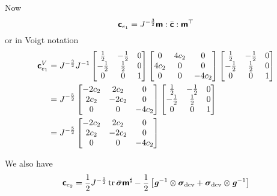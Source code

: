 Now
\begin{equation}
  \boldsymbol{\mathsf{c}}_{e_{1}}=J^{-\frac{3}{2}} \boldsymbol{\mathsf{m}} : \bar{\boldsymbol{\mathsf{c}}} :  {\boldsymbol{\mathsf{m}}}^{ \top }  
\end{equation}
or in Voigt notation
\begin{equation}
  \begin{split}
    \boldsymbol{\mathsf{c}}_{e_{1}}^{V}&=J^{-\frac{3}{2}} {J}^{-1} \begin{bmatrix}
      \frac{1}{2} & -\frac{1}{2} & 0 \\
      -\frac{1}{2} & \frac{1}{2} & 0 \\
      0 & 0 & 1
    \end{bmatrix}\begin{bmatrix}
      0 & 4c_{2} & 0 \\
      4c_{2} & 0 & 0 \\
      0 & 0 & -4c_{2}
    \end{bmatrix}\begin{bmatrix}
      \frac{1}{2} & -\frac{1}{2} & 0 \\
      -\frac{1}{2} & \frac{1}{2} & 0 \\
      0 & 0 & 1
    \end{bmatrix}\\
    &=J^{-\frac{5}{2}}\begin{bmatrix}
      -2c_{2} & 2c_{2} & 0 \\
      2c_{2} & -2c_{2} & 0 \\
      0 & 0 & -4c_{2}
    \end{bmatrix}\begin{bmatrix}
      \frac{1}{2} & -\frac{1}{2} & 0 \\
      -\frac{1}{2} & \frac{1}{2} & 0 \\
      0 & 0 & 1
    \end{bmatrix}\\
    &=J^{-\frac{5}{2}}\begin{bmatrix}
      -2c_{2} & 2c_{2} & 0 \\
      2c_{2} & -2c_{2} & 0 \\
      0 & 0 & -4c_{2}
    \end{bmatrix}
  \end{split}
\end{equation}

We also have
\begin{equation}
  \boldsymbol{\mathsf{c}}_{e_{2}}=\dfrac{1}{2}J^{-\frac{1}{2}}\operatorname{tr}\bar{\boldsymbol{\mathit{\sigma}}}\boldsymbol{\mathsf{m}}^{\sharp}
  -\dfrac{1}{2}\left[   {\boldsymbol{\mathit{g}}}^{-1}  \otimes \boldsymbol{\mathit{\sigma}}_{\operatorname{dev}} + \boldsymbol{\mathit{\sigma}}_{\operatorname{dev}} \otimes  {\ensuremath{\boldsymbol{\mathit{g}}}}^{-1}   \right]
\end{equation}

